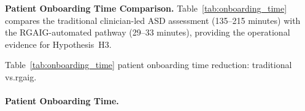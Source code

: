 \noindent\textbf{Patient Onboarding Time Comparison.} Table~\ref{tab:onboarding_time} compares the traditional clinician-led ASD assessment (135--215 minutes) with the RGAIG-automated pathway (29--33 minutes), providing the operational evidence for Hypothesis~H3.


\noindent Table~\ref{tab:onboarding_time} patient onboarding time reduction: traditional vs.rgaig.

\paragraph{Patient Onboarding Time.}




